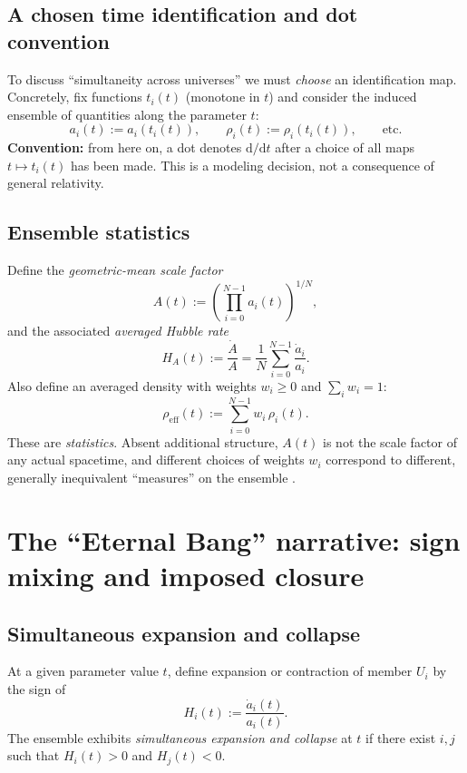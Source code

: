 \documentclass[11pt]{article}
\begin{document}
\subsection{A chosen time identification and dot convention}

To discuss ``simultaneity across universes'' we must \emph{choose} an identification map. Concretely, fix functions $t_i(t)$ (monotone in $t$) and consider the induced ensemble of quantities along the parameter $t$:
\[
a_i(t) := a_i(t_i(t)),\qquad \rho_i(t):=\rho_i(t_i(t)),\qquad \text{etc.}
\]
\textbf{Convention:} from here on, a dot denotes $\mathrm{d}/\mathrm{d}t$ after a choice of all maps $t\mapsto t_i(t)$ has been made. This is a modeling decision, not a consequence of general relativity.

\subsection{Ensemble statistics}

Define the \emph{geometric-mean scale factor}
\begin{equation}
A(t):=\left(\prod_{i=0}^{N-1} a_i(t)\right)^{1/N},
\end{equation}
and the associated \emph{averaged Hubble rate}
\begin{equation}
H_A(t):=\frac{\dot A}{A}=\frac{1}{N}\sum_{i=0}^{N-1}\frac{\dot a_i}{a_i}.
\end{equation}
Also define an averaged density with weights $w_i\ge0$ and $\sum_i w_i=1$:
\begin{equation}
\rho_{\mathrm{eff}}(t):=\sum_{i=0}^{N-1} w_i\,\rho_i(t).
\end{equation}
These are \emph{statistics}. Absent additional structure, $A(t)$ is not the scale factor of any actual spacetime, and different choices of weights $w_i$ correspond to different, generally inequivalent ``measures'' on the ensemble \citep{Buchert2000,ClarksonEtAl2011}.

\section{The ``Eternal Bang'' narrative: sign mixing and imposed closure}

\subsection{Simultaneous expansion and collapse}

At a given parameter value $t$, define expansion or contraction of member $U_i$ by the sign of
\[
H_i(t):=\frac{\dot a_i(t)}{a_i(t)}.
\]
The ensemble exhibits \emph{simultaneous expansion and collapse} at $t$ if there exist $i,j$ such that $H_i(t)>0$ and $H_j(t)<0$.
\end{document}
